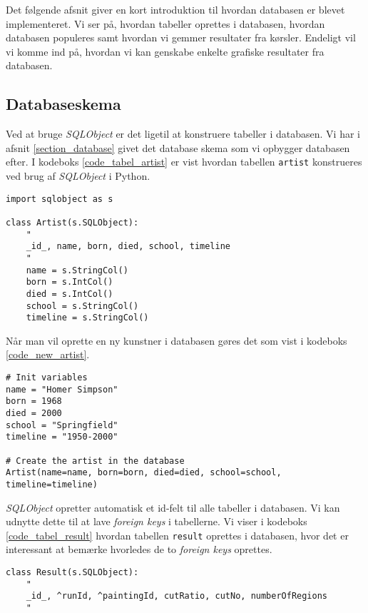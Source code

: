 {
{\sffamily Det følgende afsnit giver en kort introduktion til hvordan
databasen er blevet implementeret. Vi ser på, hvordan tabeller oprettes
i databasen, hvordan databasen populeres samt hvordan vi gemmer
resultater fra kørsler. Endeligt vil vi komme ind på, hvordan vi kan
genskabe enkelte grafiske resultater fra databasen.
}

\subsection{Databaseskema}
Ved at bruge \emph{SQLObject} er det ligetil at konstruere tabeller i
databasen. Vi har i afsnit \ref{section_database} givet det database
skema som vi opbygger databasen efter. I kodeboks
\ref{code_tabel_artist} er vist hvordan tabellen \texttt{artist}
konstrueres ved brug af \emph{SQLObject} i Python.

\begin{lstlisting}[caption={Pythonkode for oprettelse af tabeller i
    databasen.}, captionpos=b, label={code_tabel_artist}, frame=tb,
    breaklines=false, float=hb]
import sqlobject as s

class Artist(s.SQLObject):
    "
    _id_, name, born, died, school, timeline
    "
    name = s.StringCol()
    born = s.IntCol()
    died = s.IntCol()
    school = s.StringCol()
    timeline = s.StringCol()
\end{lstlisting}

Når man vil oprette en ny kunstner i databasen gøres det som vist
i kodeboks \ref{code_new_artist}.

\begin{lstlisting}[caption={Oprettelse af en kunstner i databasen.},
    captionpos=b, label={code_new_artist}, frame=tb, breaklines=false,
    float=h]
# Init variables
name = "Homer Simpson"
born = 1968
died = 2000
school = "Springfield"
timeline = "1950-2000"

# Create the artist in the database
Artist(name=name, born=born, died=died, school=school, timeline=timeline)
\end{lstlisting}

\emph{SQLObject} opretter automatisk et id-felt til alle tabeller i
databasen. Vi kan udnytte dette til at lave \emph{foreign keys} i
tabellerne. Vi viser i kodeboks \ref{code_tabel_result} hvordan tabellen
\texttt{result} oprettes i databasen, hvor det er interessant at bemærke
hvorledes de to \emph{foreign keys} oprettes.

\begin{lstlisting}[caption={Pythonkode for oprettelse af \emph{foreign
    keys} i databasen.}, captionpos=b, label={code_tabel_result}, frame=tb,
    breaklines=false, float=h]
class Result(s.SQLObject):
    "
    _id_, ^runId, ^paintingId, cutRatio, cutNo, numberOfRegions
    "


\end{lstlisting}}
